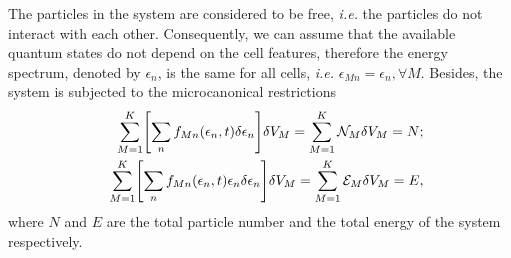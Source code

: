 %
The particles in the system are considered to be free, \textit{i.e.} the
particles do not interact with each other.
Consequently, we can assume that the available quantum states do not depend on
the cell features,
therefore the energy spectrum, denoted by $\epsilon_n$, is the same for all
cells, \textit{i.e.} $\epsilon_{Mn} = \epsilon_n, \forall M$. Besides, the
system is subjected to the microcanonical restrictions
%
\begin{eqnarray}
    &&\sum_{M=1}^{K} \left[ \sum_{n}f_{Mn}(\epsilon_{n} ,t)\de \epsilon_n\right] \de V_M=\sum_{M=1}^{K} {\mathcal{N}}_{M} \de V_M=N; \nonumber \\
    &&\sum_{M=1}^{K}\left[ \sum_{n}f_{Mn}(\epsilon_{n},t)\epsilon_{n}\delta \epsilon_n\right] \de V_M=\sum_{M=1}^{K} {\mathcal{E}}_M \delta V_M=E, \label{restriccions1}
\end{eqnarray}
%
where $N$ and $E$ are the total particle number and the total energy of the
system respectively.

